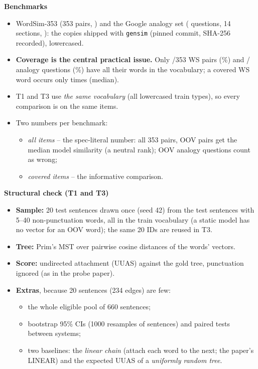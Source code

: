 \documentclass[11pt,a4paper]{article}
\newcommand{\blk}[1]{\par\needspace{5\baselineskip}\smallskip\noindent\textbf{#1}\par\nobreak\vspace{1pt}}
\begin{document}
\blk{Benchmarks}
\begin{itemize}
\item WordSim-353 (353 pairs, \citealt{ws353}) and the Google analogy set (\ANTotal{} questions, 14 sections, \citealt{mikolov}):
the copies shipped with \texttt{gensim} (pinned commit, SHA-256 recorded), lowercased.
\item \textbf{Coverage is the central practical issue.} Only \WSCovered{}/353 WS pairs (\WSCoverPct\%) and \ANCovered{}/\ANTotal{}
analogy questions (\ANCoverPct\%) have all their words in the vocabulary; a covered WS word occurs only \WSMedianCount{} times (median).
\item T1 and T3 use \emph{the same vocabulary} (all lowercased train types), so every comparison is on the same items.
\item Two numbers per benchmark:
\begin{itemize}
\item \emph{all items} -- the spec-literal number: all 353 pairs, OOV pairs get the median model similarity (a neutral rank);
OOV analogy questions count as wrong;
\item \emph{covered items} -- the informative comparison.
\end{itemize}
\end{itemize}

\blk{Structural check (T1 and T3)}
\begin{itemize}
\item \textbf{Sample:} 20 test sentences drawn once (seed 42) from the \MSTPool{} test sentences with 5--40 non-punctuation words,
all in the train vocabulary (a static model has no vector for an OOV word); the same 20 IDs are reused in T3.
\item \textbf{Tree:} Prim's MST over pairwise cosine distances of the words' vectors.
\item \textbf{Score:} undirected attachment (UUAS) against the gold tree, punctuation ignored (as in the probe paper).
\item \textbf{Extras}, because 20 sentences (234 edges) are few:
\begin{itemize}
\item the whole eligible pool of 660 sentences;
\item bootstrap 95\% CIs (1000 resamples of sentences) and paired tests between systems;
\item two baselines: the \emph{linear chain} (attach each word to the next; the paper's LINEAR) and the expected UUAS of a
\emph{uniformly random tree}.
\end{itemize}
\end{itemize}
\end{document}
